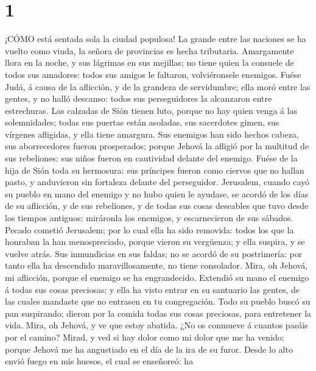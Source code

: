 \hypertarget{section}{%
\section{1}\label{section}}

 ¡CÓMO está sentada sola la ciudad populosa! La grande entre
las naciones se ha vuelto como viuda, la señora de provincias es hecha
tributaria.  Amargamente llora en la noche, y sus lágrimas
en sus mejillas; no tiene quien la consuele de todos sus amadores: todos
sus amigos le faltaron, volviéronsele enemigos.  Fuése Judá,
á causa de la aflicción, y de la grandeza de servidumbre; ella moró
entre las gentes, y no halló descanso: todos sus perseguidores la
alcanzaron entre estrechuras.  Las calzadas de Sión tienen
luto, porque no hay quien venga á las solemnidades; todas sus puertas
están asoladas, sus sacerdotes gimen, sus vírgenes afligidas, y ella
tiene amargura.  Sus enemigos han sido hechos cabeza, sus
aborrecedores fueron prosperados; porque Jehová la afligió por la
multitud de sus rebeliones: sus niños fueron en cautividad delante del
enemigo.  Fuése de la hija de Sión toda su hermosura: sus
príncipes fueron como ciervos que no hallan pasto, y anduvieron sin
fortaleza delante del perseguidor.  Jerusalem, cuando cayó
su pueblo en mano del enemigo y no hubo quien le ayudase, se acordó de
los días de su aflicción, y de sus rebeliones, y de todas sus cosas
deseables que tuvo desde los tiempos antiguos: miráronla los enemigos, y
escarnecieron de sus sábados.  Pecado cometió Jerusalem; por
lo cual ella ha sido removida: todos los que la honraban la han
menospreciado, porque vieron su vergüenza; y ella suspira, y se vuelve
atrás.  Sus inmundicias en sus faldas; no se acordó de su
postrimería: por tanto ella ha descendido maravillosamente, no tiene
consolador. Mira, oh Jehová, mi aflicción, porque el enemigo se ha
engrandecido.  Extendió su mano el enemigo á todas sus
cosas preciosas; y ella ha visto entrar en su santuario las gentes, de
las cuales mandaste que no entrasen en tu congregación. 
Todo su pueblo buscó su pan suspirando; dieron por la comida todas sus
cosas preciosas, para entretener la vida. Mira, oh Jehová, y ve que
estoy abatida.  ¿No os conmueve á cuantos pasáis por el
camino? Mirad, y ved si hay dolor como mi dolor que me ha venido; porque
Jehová me ha angustiado en el día de la ira de su furor. 
Desde lo alto envió fuego en mis huesos, el cual se enseñoreó: ha

